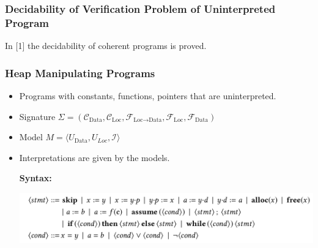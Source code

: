 \documentclass[aspectratio=1610, 13pt]{beamer}
\begin{document}
\begin{frame}\frametitle{Decidability of Verification Problem of Uninterpreted Program}
In [1] the decidability of coherent programs is proved.
\end{frame}

\begin{frame}\frametitle{Heap Manipulating Programs}
\begin{itemize}
\item Programs with constants, functions, pointers that are uninterpreted.
\item Signature $\Sigma = (\mathcal{C}_{\text{Data}}, \mathcal{C}_{\text{Loc}}, \mathcal{F}_{\text{Loc}\rightarrow \text{Data}}, \mathcal{F}_{\text{Loc}}, \mathcal{F}_{\text{Data}})$
\item Model $M = \langle U_{\text{Data}}, U_{Loc}, \mathcal{I}\rangle$


\item Interpretations are given by the models.

\textbf{Syntax:}

\begin{center}
\includegraphics[scale=0.28]{program_syntax.png}
\end{center}
\end{itemize}
\end{frame}
\end{document}
